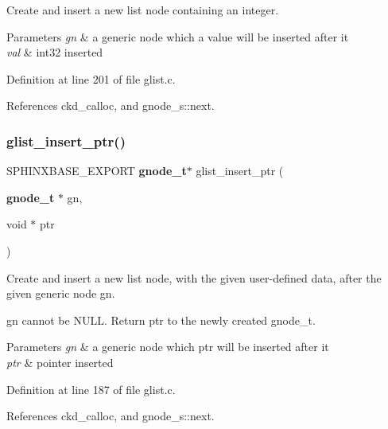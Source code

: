 Create and insert a new list node containing an integer. 


\begin{DoxyParams}{Parameters}
{\em gn} & a generic node which a value will be inserted after it \\
\hline
{\em val} & int32 inserted \\
\hline
\end{DoxyParams}


Definition at line 201 of file glist.\+c.



References ckd\+\_\+calloc, and gnode\+\_\+s\+::next.

\mbox{\label{glist_8h_a2d641da6b349c1c939e3b954382513ba}} 
\subsubsection{glist\+\_\+insert\+\_\+ptr()}
{\footnotesize\ttfamily S\+P\+H\+I\+N\+X\+B\+A\+S\+E\+\_\+\+E\+X\+P\+O\+RT \textbf{ gnode\+\_\+t}$\ast$ glist\+\_\+insert\+\_\+ptr (\begin{DoxyParamCaption}\item[{\textbf{ gnode\+\_\+t} $\ast$}]{gn,  }\item[{void $\ast$}]{ptr }\end{DoxyParamCaption})}



Create and insert a new list node, with the given user-\/defined data, after the given generic node gn. 

gn cannot be N\+U\+LL. Return ptr to the newly created gnode\+\_\+t. 
\begin{DoxyParams}{Parameters}
{\em gn} & a generic node which ptr will be inserted after it \\
\hline
{\em ptr} & pointer inserted \\
\hline
\end{DoxyParams}


Definition at line 187 of file glist.\+c.



References ckd\+\_\+calloc, and gnode\+\_\+s\+::next.

\mbox{\label{glist_8h_ab7e58ee641d3648f047eef70a20a4647}} 
